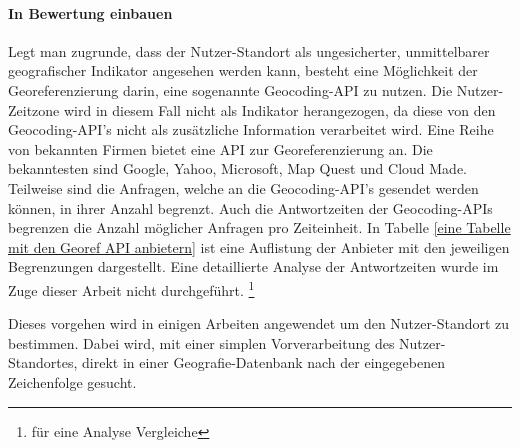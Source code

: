 	\paragraph{In Bewertung einbauen} 
	Legt man zugrunde, dass der Nutzer-Standort als ungesicherter, unmittelbarer geografischer Indikator angesehen werden kann, besteht eine Möglichkeit der Georeferenzierung darin, eine sogenannte Geocoding-API zu nutzen.
	Die Nutzer-Zeitzone wird in diesem Fall nicht als Indikator herangezogen, da diese von den Geocoding-API's nicht als zusätzliche Information verarbeitet wird. 
	Eine Reihe von bekannten Firmen bietet eine API zur Georeferenzierung an. 
	Die bekanntesten sind Google, Yahoo, Microsoft, Map Quest und Cloud Made. 
	Teilweise sind die Anfragen, welche an die Geocoding-API's gesendet werden können, in ihrer Anzahl begrenzt.
	Auch die Antwortzeiten der Geocoding-APIs begrenzen die Anzahl möglicher Anfragen pro Zeiteinheit. 
	In Tabelle \ref{eine Tabelle mit den Georef API anbietern} ist eine Auflistung der Anbieter mit den jeweiligen Begrenzungen dargestellt.
	Eine detaillierte Analyse der Antwortzeiten wurde im Zuge dieser Arbeit nicht durchgeführt.  \footnote{für eine Analyse Vergleiche} 


	
	Dieses vorgehen wird in einigen Arbeiten angewendet um den Nutzer-Standort zu bestimmen. 
	Dabei wird, mit einer simplen Vorverarbeitung des Nutzer-Standortes, direkt in einer Geografie-Datenbank nach der eingegebenen Zeichenfolge gesucht. 
